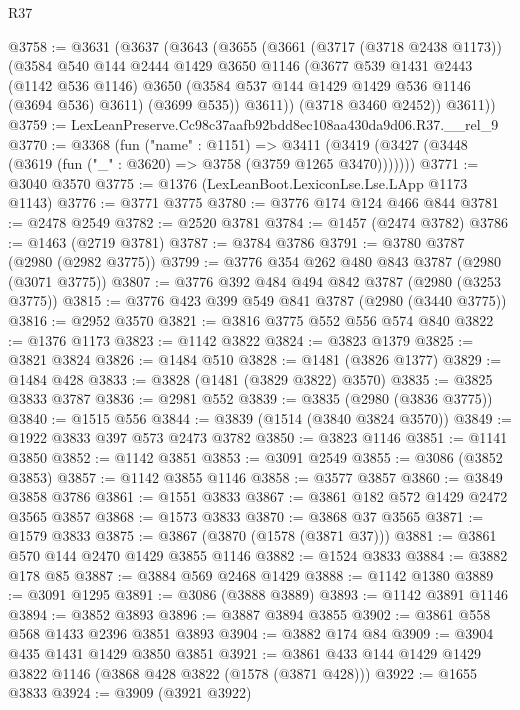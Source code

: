 \begin{lexlean}{R37}
\begin{coremodule}
@3758 := @3631
    (@3637
      (@3643
        (@3655
          (@3661
            (@3717 (@3718 @2438 @1173))
            (@3584
              @540
              @144
              @2444
              @1429
              @3650
              @1146
              (@3677
                @539
                @1431
                @2443
                (@1142 @536 @1146)
                @3650
                (@3584 @537 @144 @1429 @1429 @536 @1146 (@3694 @536) @3611)
                (@3699 @535))
              @3611))
          (@3718 @3460 @2452))
        @3611))
@3759 := LexLeanPreserve.Cc98c37aafb92bdd8ec108aa430da9d06.R37.__rel_9
@3770 := @3368
    (fun ("name" : @1151) =>
    @3411 (@3419 (@3427 (@3448 (@3619 (fun ("_" : @3620) => @3758 (@3759 @1265 @3470)))))))
@3771 := @3040 @3570
@3775 := @1376 (LexLeanBoot.LexiconLse.Lse.LApp @1173 @1143)
@3776 := @3771 @3775
@3780 := @3776 @174 @124 @466 @844
@3781 := @2478 @2549
@3782 := @2520 @3781
@3784 := @1457 (@2474 @3782)
@3786 := @1463 (@2719 @3781)
@3787 := @3784 @3786
@3791 := @3780 @3787 (@2980 (@2982 @3775))
@3799 := @3776 @354 @262 @480 @843 @3787 (@2980 (@3071 @3775))
@3807 := @3776 @392 @484 @494 @842 @3787 (@2980 (@3253 @3775))
@3815 := @3776 @423 @399 @549 @841 @3787 (@2980 (@3440 @3775))
@3816 := @2952 @3570
@3821 := @3816 @3775 @552 @556 @574 @840
@3822 := @1376 @1173
@3823 := @1142 @3822
@3824 := @3823 @1379
@3825 := @3821 @3824
@3826 := @1484 @510
@3828 := @1481 (@3826 @1377)
@3829 := @1484 @428
@3833 := @3828 (@1481 (@3829 @3822) @3570)
@3835 := @3825 @3833 @3787
@3836 := @2981 @552
@3839 := @3835 (@2980 (@3836 @3775))
@3840 := @1515 @556
@3844 := @3839 (@1514 (@3840 @3824 @3570))
@3849 := @1922 @3833 @397 @573 @2473 @3782
@3850 := @3823 @1146
@3851 := @1141 @3850
@3852 := @1142 @3851
@3853 := @3091 @2549
@3855 := @3086 (@3852 @3853)
@3857 := @1142 @3855 @1146
@3858 := @3577 @3857
@3860 := @3849 @3858 @3786
@3861 := @1551 @3833
@3867 := @3861 @182 @572 @1429 @2472 @3565 @3857
@3868 := @1573 @3833
@3870 := @3868 @37 @3565
@3871 := @1579 @3833
@3875 := @3867 (@3870 (@1578 (@3871 @37)))
@3881 := @3861 @570 @144 @2470 @1429 @3855 @1146
@3882 := @1524 @3833
@3884 := @3882 @178 @85
@3887 := @3884 @569 @2468 @1429
@3888 := @1142 @1380
@3889 := @3091 @1295
@3891 := @3086 (@3888 @3889)
@3893 := @1142 @3891 @1146
@3894 := @3852 @3893
@3896 := @3887 @3894 @3855
@3902 := @3861 @558 @568 @1433 @2396 @3851 @3893
@3904 := @3882 @174 @84
@3909 := @3904 @435 @1431 @1429 @3850 @3851
@3921 := @3861 @433 @144 @1429 @1429 @3822 @1146 (@3868 @428 @3822 (@1578 (@3871 @428)))
@3922 := @1655 @3833
@3924 := @3909 (@3921 @3922)

\end{coremodule}
\end{lexlean}
